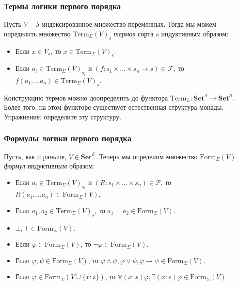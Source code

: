 \documentclass{beamer}
\theoremstyle{definition}
\newcommand{\cat}[1]{\mathbf{#1}}
\newcommand{\Set}{\cat{Set}}
\newcommand{\fs}[1]{\mathrm{#1}}
\begin{document}
\begin{frame}
\frametitle{Термы логики первого порядка}
Пусть $V$ -- $\mathcal{S}$-индексированное множество переменных.
Тогда мы можем определить множество $\fs{Term}_\Sigma(V)_s$ \emph{термов} сорта $s$ индуктивным образом:
\begin{itemize}
\item Если $x \in V_s$, то $x \in \fs{Term}_\Sigma(V)_s$.
\item Если $a_i \in \fs{Term}_\Sigma(V)_{s_i}$ и $(f : s_1 \times \ldots \times s_n \to s) \in \mathcal{F}$, то $f(a_1, \ldots a_n) \in \fs{Term}_\Sigma(V)_s$.
\end{itemize}
Конструкцию термов можно доопределить до функтора $\fs{Term}_\Sigma : \Set^\mathcal{S} \to \Set^\mathcal{S}$.
Более того, на этом функторе существует естественная структура монады.
Упражнение: определите эту структуру.
\end{frame}

\begin{frame}
\frametitle{Формулы логики первого порядка}
Пусть, как и раньше, $V \in \Set^\mathcal{S}$.
Теперь мы определим множество $\fs{Form}_\Sigma(V)$ \emph{формул} индуктивным образом:
\begin{itemize}
\item Если $a_i \in \fs{Term}_\Sigma(V)_{s_i}$ и $(R : s_1 \times \ldots \times s_n) \in \mathcal{P}$, то $R(a_1, \ldots a_n) \in \fs{Form}_\Sigma(V)$.
\item Если $a_1,a_2 \in \fs{Term}_\Sigma(V)_s$, то $a_1 = a_2 \in \fs{Form}_\Sigma(V)$.
\item $\bot, \top \in \fs{Form}_\Sigma(V)$.
\item Если $\varphi \in \fs{Form}_\Sigma(V)$, то $\neg \varphi \in \fs{Form}_\Sigma(V)$.
\item Если $\varphi, \psi \in \fs{Form}_\Sigma(V)$, то $\varphi \land \psi, \varphi \lor \psi, \varphi \to \psi \in \fs{Form}_\Sigma(V)$.
\item Если $\varphi \in \fs{Form}_\Sigma(V \cup \{ x : s \})$, то $\forall (x : s) \varphi, \exists (x : s) \varphi \in \fs{Form}_\Sigma(V)$.
\end{itemize}
\end{frame}
\end{document}
